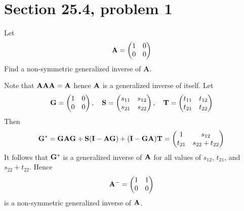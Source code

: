 \section{Section 25.4, problem 1}
Let
$${\bf A}=\left(\begin{matrix}
1 & 0\cr
0 & 0
\end{matrix}\right)
$$
Find a non-symmetric generalized inverse of {\bf A}.

\bigskip
\noindent
Note that ${\bf{AAA}=A}$ hence ${\bf A}$ is a generalized inverse
of itself.
Let
$${\bf G}=\left(\begin{matrix}
1 & 0\cr
0 & 0
\end{matrix}\right),\quad
{\bf S}=\left(\begin{matrix}
s_{11} & s_{12}\cr
s_{21} & s_{22}
\end{matrix}\right),\quad
{\bf T}=\left(\begin{matrix}
t_{11} & t_{12}\cr
t_{21} & t_{22}
\end{matrix}\right)
$$
Then
$${\bf G}^*={\bf GAG}+{\bf S}({\bf I}-{\bf AG})
+({\bf I}-{\bf GA}){\bf T}
=\left(\begin{matrix}
1 & s_{12}\cr
t_{21} & s_{22}+t_{22}
\end{matrix}\right)
$$
It follows that ${\bf G}^*$ is a generalized inverse of $\bf A$ for
all values of $s_{12}$, $t_{21}$, and $s_{22}+t_{22}$.
Hence
$${\bf A}^{-{}}=\left(\begin{matrix}
1 & 1\cr
0 & 0
\end{matrix}\right)
$$
is a non-symmetric generalized inverse of $\bf A$.
